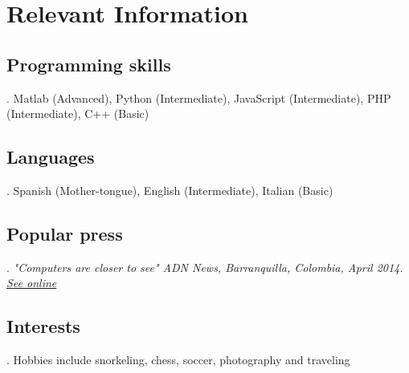 \documentclass[letterpaper,10pt]{article}
\begin{document}
\section{Relevant Information}

\subsection{Programming skills}. Matlab (Advanced), Python (Intermediate), JavaScript (Intermediate), PHP (Intermediate), C++ (Basic)
\subsection{Languages}. Spanish (Mother-tongue), English (Intermediate), Italian (Basic)
\subsection{Popular press}. \emph{"Computers are closer to see" ADN News, Barranquilla, Colombia, April 2014. \href{http://diarioadn.co/barranquilla/mi-ciudad/computadores-que-vean-quieren-desarrollar-en-uninorte-1.100357}{See online}}
\subsection{Interests}. Hobbies include snorkeling, chess, soccer, photography and traveling
\end{document}
